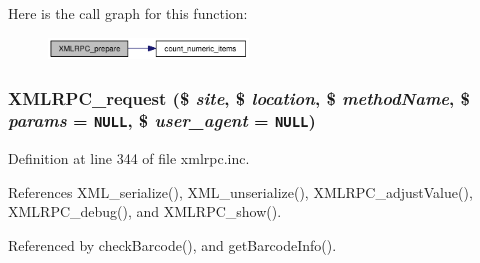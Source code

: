 Here is the call graph for this function:\nopagebreak
\begin{figure}[H]
\begin{center}
\leavevmode
\includegraphics[width=151pt]{xmlrpc_8inc_c13be54b26e0803d8745e4f019dcfd8a_cgraph}
\end{center}
\end{figure}
\hypertarget{xmlrpc_8inc_3a98b6984b8ca01752d1aa9a267526a3}{
\subsubsection{\setlength{\rightskip}{0pt plus 5cm}XMLRPC\_\-request (\$ {\em site}, \$ {\em location}, \$ {\em methodName}, \$ {\em params} = {\tt NULL}, \$ {\em user\_\-agent} = {\tt NULL})}}
\label{xmlrpc_8inc_3a98b6984b8ca01752d1aa9a267526a3}




Definition at line 344 of file xmlrpc.inc.

References XML\_\-serialize(), XML\_\-unserialize(), XMLRPC\_\-adjustValue(), XMLRPC\_\-debug(), and XMLRPC\_\-show().

Referenced by checkBarcode(), and getBarcodeInfo().

